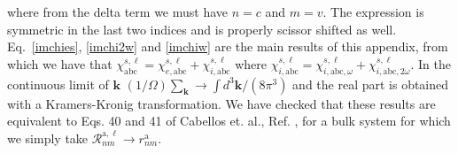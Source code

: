 where from the delta term we must have $n=c$ and $m=v$. The expression
is symmetric in the last two indices and is properly scissor shifted
as well. Eq.~\eqref{imchies}, \eqref{imchi2w} and \eqref{imchiw}
are the main results of this appendix, from which we have that
$\chi_{\mathrm{a}\mathrm{b}\mathrm{c}}^{s,\ell}=\chi_{e,\mathrm{a}\mathrm{b}\mathrm{c}}^{s,\ell}+\chi_{i,\mathrm{a}\mathrm{b}\mathrm{c}}^{s,\ell}$ 
where
$\chi_{i,\mathrm{a}\mathrm{b}\mathrm{c}}^{s,\ell}=\chi_{i,\mathrm{a}\mathrm{b}\mathrm{c},\omega}^{s,\ell}+\chi_{i,\mathrm{a}\mathrm{b}\mathrm{c},2\omega}^{s,\ell}$. 
In the continuous limit of $\mathbf{k}$ 
$(1/\Omega)\sum_{\mathbf{k}}\to\int d^3\mathbf{k}/(8\pi^3)$ and the real part is 
obtained with a Kramers-Kronig transformation. 
We have checked that these results are equivalent to Eqs. 40 and 41 of
Cabellos et. al., Ref. \cite{cabellosPRB09}, for a bulk system for which we
simply take $\mathcal{R}^{\mathrm{a},\ell}_{nm}\to r^{\mathrm{a}}_{nm}$.

